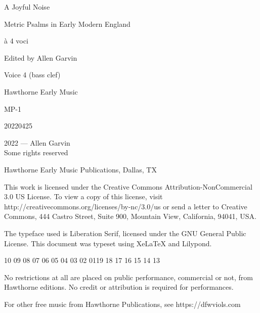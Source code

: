 \documentclass[12pt]{memoir}
\begin{document}
\pagestyle{empty}

\vspace*{\fill}

\begin{center}
\fontsize{44pt}{44pt}\selectfont
    A Joyful Noise\par
    \vspace{1in}
    Metric Psalms in Early Modern England\par
\end{center}

\begin{center}
\fontsize{24pt}{24pt}\selectfont
à 4 voci\par
    \vspace{1in}
\end{center}

\begin{center}
\fontsize{14pt}{14pt}\selectfont
Edited by Allen Garvin\par
    \vspace{1in}
\fontsize{14pt}{14pt}\selectfont
Voice 4 (bass clef)\par
\vspace*{2mm}
\end{center}

\vspace*{\fill}

\begin{center}
Hawthorne Early Music\par
MP-1\par
20220425
\end{center}

\begingroup
\footnotesize
\setlength{\parindent}{0pt}
\setlength{\parskip}{\baselineskip}
\textcopyright{}2022 --- Allen Garvin\\
Some rights reserved

Hawthorne Early Music Publications, Dallas, TX

This work is licensed under the Creative Commons Attribution-NonCommercial 3.0 US License. To view a copy of this license, visit http://creativecommons.org/licenses/by-nc/3.0/us or send a letter to Creative Commons, 444 Castro Street, Suite 900, Mountain View, California, 94041, USA.

The typeface used is Liberation Serif, licensed under the GNU General Public License. This document was typeset using XeLaTeX and Lilypond.

\begin{center}
10 09 08 07 06 05 04 03 02 01\hspace{2em}19 18 17 16 15 14 13
\end{center}

No restrictions at all are placed on public performance, commercial or not, 
from Hawthorne editions. No credit or attribution is required for 
performances.

For other free music from Hawthorne Publications, see https://dfwviols.com
\end{document}
